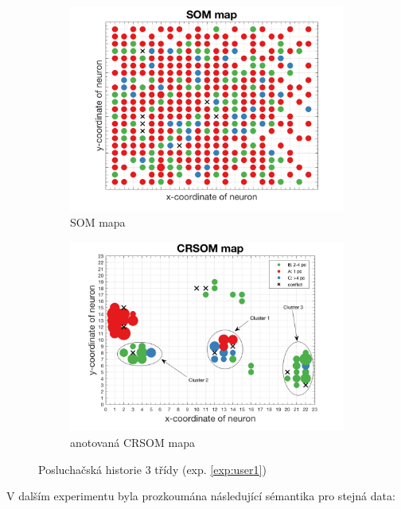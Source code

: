 \documentclass[thesis=M,czech]{FITthesis}[2012/06/26]
\begin{document}
\begin{figure}
\centering
\begin{subfigure}{.5\textwidth}
  \centering
  \includegraphics[width=.99\linewidth]{exp_user_som.png}
  \caption{SOM mapa}
  \label{fig:usersom}
\end{subfigure}%
\begin{subfigure}{.5\textwidth}
  \centering
  \includegraphics[width=.99\linewidth]{exp_user_crsom_ann.png}
  \caption{anotovaná CRSOM mapa}
  \label{fig:usercrsom}
\end{subfigure}
\caption{Posluchačská historie $3$ třídy (exp. \ref{exp:user1})}
\label{fig:user1}
\end{figure}


V dalším experimentu byla prozkoumána následující sémantika pro stejná data:
\end{document}
